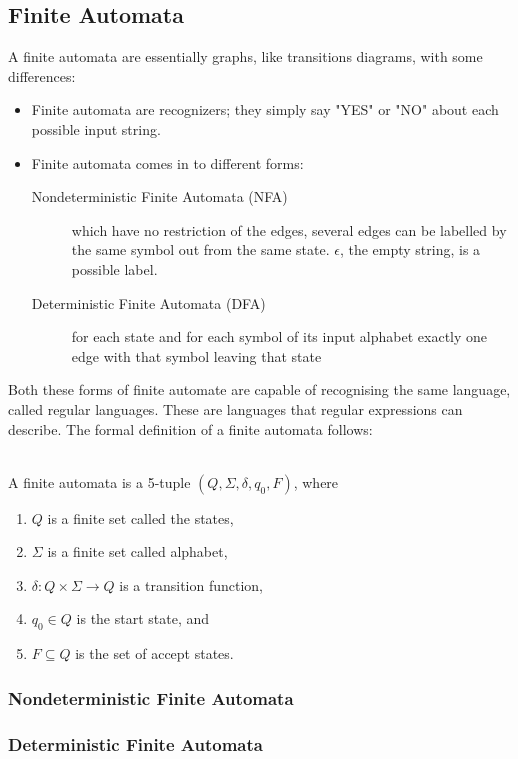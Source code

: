 \subsection{Finite Automata}
A finite automata are essentially graphs, like transitions diagrams, with some 
differences:
\begin{itemize}
  \item Finite automata are recognizers; they simply say "YES" or "NO" about 
each possible input string.
  \item Finite automata comes in to different forms:
    \begin{description}
      \item [Nondeterministic Finite Automata (NFA)] which have no restriction 
of the edges, several edges can be labelled by the same symbol out from the 
same state. $\epsilon$, the empty string, is a possible label. 
      \item [Deterministic Finite Automata (DFA)] for each state and for each 
symbol of its input alphabet exactly one edge with that symbol leaving that 
state
    \end{description}
\end{itemize}
Both these forms of finite automate are capable of recognising the same 
language, called regular languages. These are languages that regular 
expressions can describe. \cite{Aho2006}
The formal definition of a finite automata follows:
\begin{definition} \label{finiteAutomataDef} \cite{sipser2006} \\
A finite automata is a 5-tuple $(Q, \Sigma, \delta, q_0, F)$, where
\begin{enumerate}
  \item $Q$ is a finite set called the states,
  \item $\Sigma$ is a finite set called alphabet,
  \item $\delta: Q \times \Sigma \to Q$ is a transition function,
  \item $q_0 \in Q$ is the start state, and
  \item $F \subseteq Q$ is the set of accept states.
\end{enumerate}

\end{definition}
\subsubsection{Nondeterministic Finite Automata}
\subsubsection{Deterministic Finite Automata}

 
